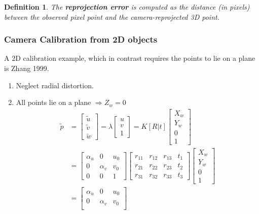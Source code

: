 \documentclass[10pt,a4paper]{scrartcl}
\newtheorem{define}{Definition}
\begin{document}
\begin{multicols*}{2}
\begin{define}
The \textbf{reprojection error} is computed as the distance (in pixels) between the observed pixel point and the camera-reprojected 3D point.
\end{define}

\subsubsection{Camera Calibration from 2D objects}

A 2D calibration example, which in contrast requires the points to lie on a plane is Zhang 1999.

\begin{enumerate}
\item Neglect radial distortion.
\item All points lie on a plane $\Rightarrow Z_w =0$
\begin{align*}
\tilde{p}&=\begin{bmatrix}
\tilde{u}\\\tilde{v}\\\tilde{w}
\end{bmatrix}=\lambda\begin{bmatrix}
u\\v\\1
\end{bmatrix}=K[R|t]\begin{bmatrix}
X_w\\Y_w\\0\\1
\end{bmatrix}\\
&=\begin{bmatrix}
\alpha_u&0&u_0\\
0&\alpha_v&v_0\\
0&0&1
\end{bmatrix}\begin{bmatrix}
r_{11}&r_{12}&r_{13}&t_1\\
r_{21}&r_{22}&r_{23}&t_2\\
r_{31}&r_{32}&r_{33}&t_3
\end{bmatrix}\begin{bmatrix}
X_w\\Y_w\\0\\1
\end{bmatrix}\\
&=\begin{bmatrix}
\alpha_u&0&u_0\\
0&\alpha_v&v_0\\

\end{bmatrix}
\end{align*}
\end{enumerate}
\end{multicols*}
\end{document}
